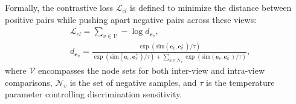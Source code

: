 \documentclass[lettersize,journal]{IEEEtran}
\newcommand{\revise}[1]{\textcolor{blue}{#1}}
\begin{document}

Formally, the contrastive loss $\mathcal{L}_{cl}$ is defined to minimize the distance between positive pairs while pushing apart negative pairs across these views:
\begin{equation}
\begin{aligned}
& \mathcal{L}_{cl}= \sum_{v \in \mathcal{V}} -\log d_{\mathbf{e}_v}, \\
& d_{\mathbf{e}_v}= \frac{\exp(\text{sim}(\mathbf{e}_v, \mathbf{e}_v^+)/\tau)}{\exp(\text{sim}(\mathbf{e}_v, \mathbf{e}_v^+)/\tau) + \sum_{k \in \mathcal{N}_v} \exp(\text{sim}(\mathbf{e}_v, \mathbf{e}_k^-)/\tau)},
\end{aligned}
\label{eq:cl}
\end{equation}
where $\mathcal{V}$ encompasses the node sets for both inter-view and intra-view comparisons, $\mathcal{N}_v$ is the set of negative samples, and $\tau$ is the temperature parameter controlling discrimination sensitivity.
\end{document}
